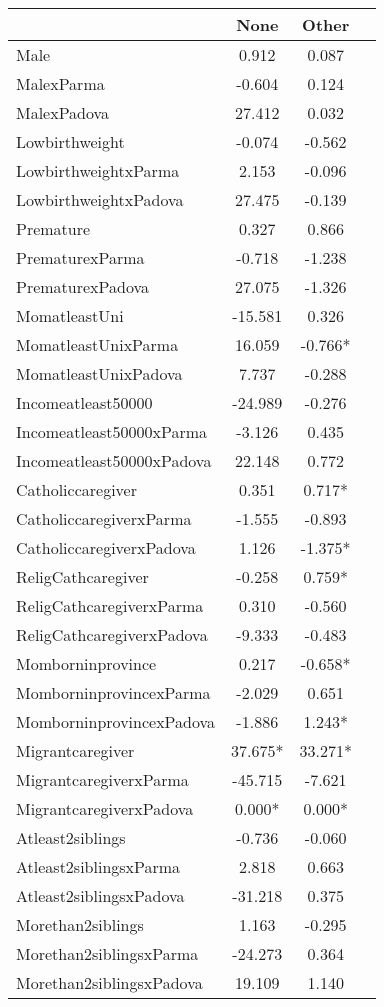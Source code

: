 \begin{tabular}{l c c c}
\toprule
& None & Other \\
\midrule
Male &     0.912 &     0.087 \\
MalexParma &    -0.604 &     0.124 \\
MalexPadova &    27.412 &     0.032 \\
Lowbirthweight &    -0.074 &    -0.562 \\
LowbirthweightxParma &     2.153 &    -0.096 \\
LowbirthweightxPadova &    27.475 &    -0.139 \\
Premature &     0.327 &     0.866 \\
PrematurexParma &    -0.718 &    -1.238 \\
PrematurexPadova &    27.075 &    -1.326 \\
MomatleastUni &   -15.581 &     0.326 \\
MomatleastUnixParma &    16.059 & -0.766* \\
MomatleastUnixPadova &     7.737 &    -0.288 \\
Incomeatleast50000 &   -24.989 &    -0.276 \\
Incomeatleast50000xParma &    -3.126 &     0.435 \\
Incomeatleast50000xPadova &    22.148 &     0.772 \\
Catholiccaregiver &     0.351 & 0.717* \\
CatholiccaregiverxParma &    -1.555 &    -0.893 \\
CatholiccaregiverxPadova &     1.126 & -1.375* \\
ReligCathcaregiver &    -0.258 & 0.759* \\
ReligCathcaregiverxParma &     0.310 &    -0.560 \\
ReligCathcaregiverxPadova &    -9.333 &    -0.483 \\
Momborninprovince &     0.217 & -0.658* \\
MomborninprovincexParma &    -2.029 &     0.651 \\
MomborninprovincexPadova &    -1.886 & 1.243* \\
Migrantcaregiver & 37.675* & 33.271* \\
MigrantcaregiverxParma &   -45.715 &    -7.621 \\
MigrantcaregiverxPadova & 0.000* & 0.000* \\
Atleast2siblings &    -0.736 &    -0.060 \\
Atleast2siblingsxParma &     2.818 &     0.663 \\
Atleast2siblingsxPadova &   -31.218 &     0.375 \\
Morethan2siblings &     1.163 &    -0.295 \\
Morethan2siblingsxParma &   -24.273 &     0.364 \\
Morethan2siblingsxPadova &    19.109 &     1.140 \\
\bottomrule
\end{tabular}
